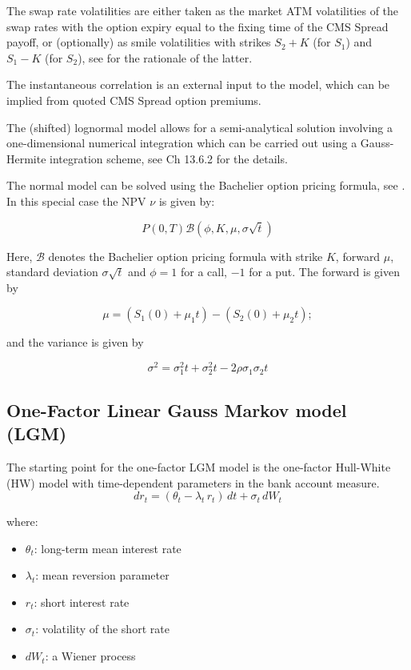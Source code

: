 The swap rate volatilities are either taken as the market ATM volatilities of 
the swap rates with the option expiry equal to the fixing time of the CMS Spread 
payoff, or (optionally) as smile volatilities with strikes $S_2+K$ (for $S_1$) and 
$S_1-K$ (for $S_2$), see \cite{Berrahoui_2004} for the rationale of the latter.

The instantaneous correlation is an external input to the model, which can be 
implied from quoted CMS Spread option premiums.

The (shifted) lognormal model allows for a semi-analytical solution involving 
a one-dimensional numerical integration which can be carried out using a 
Gauss-Hermite integration scheme, see \cite{Brigo_Mercurio_2006} Ch 13.6.2 for 
the details.

The normal model can be solved using the Bachelier option pricing formula, see \cite{Caspers_2015}. In this special case
the NPV $\nu$ is given by:

\begin{equation}
P(0,T) \mathcal{B}(\phi, K, \mu, \sigma\sqrt{t})
\end{equation}

Here, $\mathcal{B}$ denotes the Bachelier option pricing formula with strike $K$, forward $\mu$, standard deviation
$\sigma\sqrt{t}$ and $\phi=1$ for a call, $-1$ for a put. The forward is given by

\begin{equation}
\mu = (S_1(0)+\mu_1t) - (S_2(0) + \mu_2t);
\end{equation}

and the variance is given by

\begin{equation}
\sigma^2 = \sigma_1^2t + \sigma_2^2t - 2 \rho\sigma_1\sigma_2t
\end{equation}


\subsection{One-Factor Linear Gauss Markov model (LGM)}
\label{models:LGM}

The starting point for the one-factor LGM model is the one-factor Hull-White (HW)
model with time-dependent parameters in the bank account measure. 
$$
dr_t = (\theta_t-\lambda_t \,r_t)\,dt + \sigma_t\, dW_t
$$

where:
\begin{itemize}
\item $\theta_t$: long-term mean interest rate
\item $\lambda_t$: mean reversion parameter
\item $r_t$: short interest rate 
\item $\sigma_t$: volatility of the short rate
\item $dW_t$: a Wiener process
\end{itemize}


